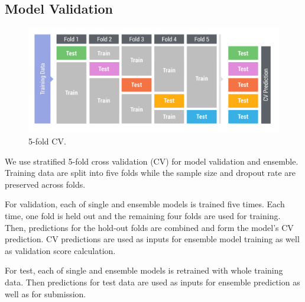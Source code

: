 \subsection{Model Validation}

\begin{figure}[!ht]
  \centering
    \includegraphics[width=0.5 \textwidth]{cv}
    \caption{5-fold CV.}
\end{figure}


We use stratified 5-fold cross validation (CV) for model validation and ensemble.
Training data are split into five folds while the sample size and dropout rate are preserved across folds.

For validation, each of single and ensemble models is trained five times. Each time, one fold is held out and the remaining four folds are used for training. Then, predictions for the hold-out folds are combined and form the model's CV prediction. CV predictions are used as inputs for ensemble model training as well as validation score calculation.

For test, each of single and ensemble models is retrained with whole training data. Then predictions for test data are used as inputs for ensemble prediction as well as for submission.
